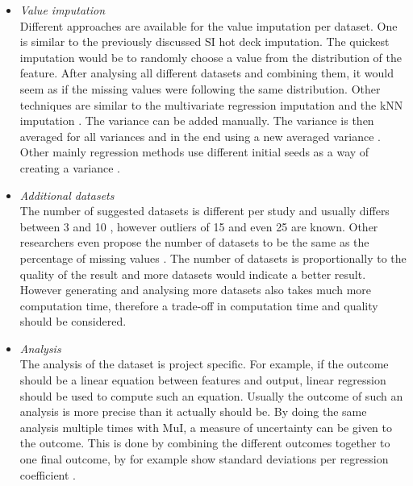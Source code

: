 \documentclass[10pt,a4paper]{report}
\begin{document}
	
	\begin{itemize}
		
		\item \textit{Value imputation} \\
		Different approaches are available for the value imputation per dataset. One is similar to the previously discussed SI hot deck imputation. The quickest imputation would be to randomly choose a value from the distribution of the feature. After analysing all different datasets and combining them, it would seem as if the missing values were following the same distribution. Other techniques are similar to the multivariate regression imputation and the kNN imputation \cite{pedersen2017missing, white2011multiple}. The variance can be added manually. The variance is then averaged for all variances and in the end using a new averaged variance \cite{donders2006gentle}. Other mainly regression methods use different initial seeds as a way of creating a variance \cite{he2010multiple}.
		
		\item \textit{Additional datasets} \\
		The number of suggested datasets is different per study and usually differs between 3 and 10 \cite{van2007multiple, pedersen2017missing, van1999multiple, van2006imputation, azur2011multiple, royston2004multiple}, however outliers of 15 \cite{martin2018impact} and even 25 \cite{raghunathan2001multivariate} are known. Other researchers even propose the number of datasets to be the same as the percentage of missing values \cite{white2011multiple}. The number of datasets is proportionally to the quality of the result and more datasets would indicate a better result. However generating and analysing more datasets also takes much more computation time, therefore a trade-off in computation time and quality should be considered.
		
		\item \textit{Analysis} \\
		The analysis of the dataset is project specific. For example, if the outcome should be a linear equation between features and output, linear regression should be used to compute such an equation. Usually the outcome of such an analysis is more precise than it actually should be. By doing the same analysis multiple times with MuI, a measure of uncertainty can be given to the outcome. This is done by combining the different outcomes together to one final outcome, by for example show standard deviations per regression coefficient \cite{donders2006gentle, van2006imputation}.
		
	\end{itemize}	
	
\end{document}
